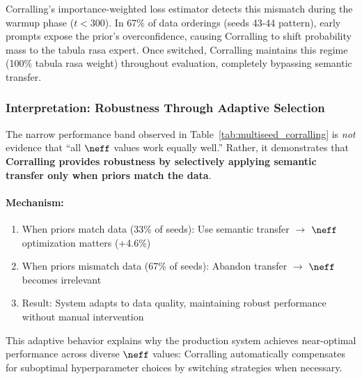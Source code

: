 Corralling's importance-weighted loss estimator detects this mismatch during the warmup phase ($t<300$). In 67\% of data orderings (seeds 43-44 pattern), early prompts expose the prior's overconfidence, causing Corralling to shift probability mass to the tabula rasa expert. Once switched, Corralling maintains this regime (100\% tabula rasa weight) throughout evaluation, completely bypassing semantic transfer.


\subsubsection{Interpretation: Robustness Through Adaptive Selection}

The narrow performance band observed in Table~\ref{tab:multiseed_corralling} is \textit{not} evidence that ``all $\neff$ values work equally well.'' Rather, it demonstrates that \textbf{Corralling provides robustness by selectively applying semantic transfer only when priors match the data}.

\paragraph{Mechanism:}
\begin{enumerate}[leftmargin=*, itemsep=2pt]
    \item When priors match data (33\% of seeds): Use semantic transfer $\to$ $\neff$ optimization matters (+4.6\%)
    \item When priors mismatch data (67\% of seeds): Abandon transfer $\to$ $\neff$ becomes irrelevant
    \item Result: System adapts to data quality, maintaining robust performance without manual intervention
\end{enumerate}

This adaptive behavior explains why the production system achieves near-optimal performance across diverse $\neff$ values: Corralling automatically compensates for suboptimal hyperparameter choices by switching strategies when necessary.


